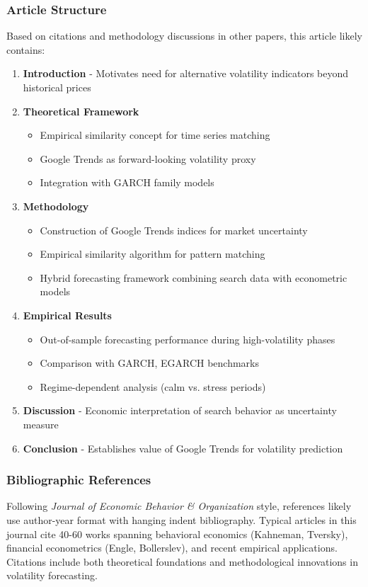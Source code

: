 \documentclass[12pt,a4paper]{article}
\begin{document}
\subsubsection{Article Structure}
Based on citations and methodology discussions in other papers, this article likely contains:
\begin{enumerate}
    \item \textbf{Introduction} - Motivates need for alternative volatility indicators beyond historical prices
    \item \textbf{Theoretical Framework}
    \begin{itemize}
        \item Empirical similarity concept for time series matching
        \item Google Trends as forward-looking volatility proxy
        \item Integration with GARCH family models
    \end{itemize}
    \item \textbf{Methodology}
    \begin{itemize}
        \item Construction of Google Trends indices for market uncertainty
        \item Empirical similarity algorithm for pattern matching
        \item Hybrid forecasting framework combining search data with econometric models
    \end{itemize}
    \item \textbf{Empirical Results}
    \begin{itemize}
        \item Out-of-sample forecasting performance during high-volatility phases
        \item Comparison with GARCH, EGARCH benchmarks
        \item Regime-dependent analysis (calm vs. stress periods)
    \end{itemize}
    \item \textbf{Discussion} - Economic interpretation of search behavior as uncertainty measure
    \item \textbf{Conclusion} - Establishes value of Google Trends for volatility prediction
\end{enumerate}

\subsubsection{Bibliographic References}
Following \textit{Journal of Economic Behavior \& Organization} style, references likely use author-year format with hanging indent bibliography. Typical articles in this journal cite 40-60 works spanning behavioral economics (Kahneman, Tversky), financial econometrics (Engle, Bollerslev), and recent empirical applications. Citations include both theoretical foundations and methodological innovations in volatility forecasting.
\end{document}
